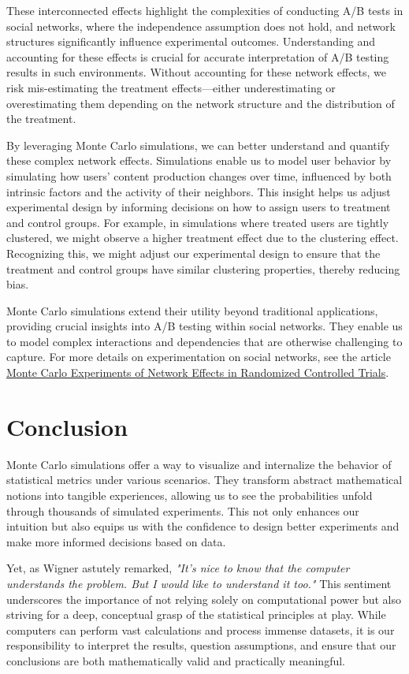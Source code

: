\documentclass[final,5p,times,twocolumn,authoryear]{elsarticle}
\begin{document}
These interconnected effects highlight the complexities of conducting A/B tests in social networks, where the independence assumption does not hold, and network structures significantly influence experimental outcomes. Understanding and accounting for these effects is crucial for accurate interpretation of A/B testing results in such environments.
Without accounting for these network effects, we risk mis-estimating the treatment effects—either underestimating or overestimating them depending on the network structure and the distribution of the treatment.

By leveraging Monte Carlo simulations, we can better understand and quantify these complex network effects. Simulations enable us to model user behavior by simulating how users' content production changes over time, influenced by both intrinsic factors and the activity of their neighbors. This insight helps us adjust experimental design by informing decisions on how to assign users to treatment and control groups. For example, in simulations where treated users are tightly clustered, we might observe a higher treatment effect due to the clustering effect. Recognizing this, we might adjust our experimental design to ensure that the treatment and control groups have similar clustering properties, thereby reducing bias.

Monte Carlo simulations extend their utility beyond traditional applications, providing crucial insights into A/B testing within social networks. They enable us to model complex interactions and dependencies that are otherwise challenging to capture. For more details on experimentation on social networks, see the article \href{https://arxiv.org/abs/2312.01607}{Monte Carlo Experiments of Network Effects in Randomized Controlled Trials}.

\section{Conclusion}

Monte Carlo simulations offer a way to visualize and internalize the behavior of statistical metrics under various scenarios. They transform abstract mathematical notions into tangible experiences, allowing us to see the probabilities unfold through thousands of simulated experiments. This not only enhances our intuition but also equips us with the confidence to design better experiments and make more informed decisions based on data.

Yet, as Wigner astutely remarked, \textit{"It's nice to know that the computer understands the problem. But I would like to understand it too."} This sentiment underscores the importance of not relying solely on computational power but also striving for a deep, conceptual grasp of the statistical principles at play. While computers can perform vast calculations and process immense datasets, it is our responsibility to interpret the results, question assumptions, and ensure that our conclusions are both mathematically valid and practically meaningful.
\end{document}
